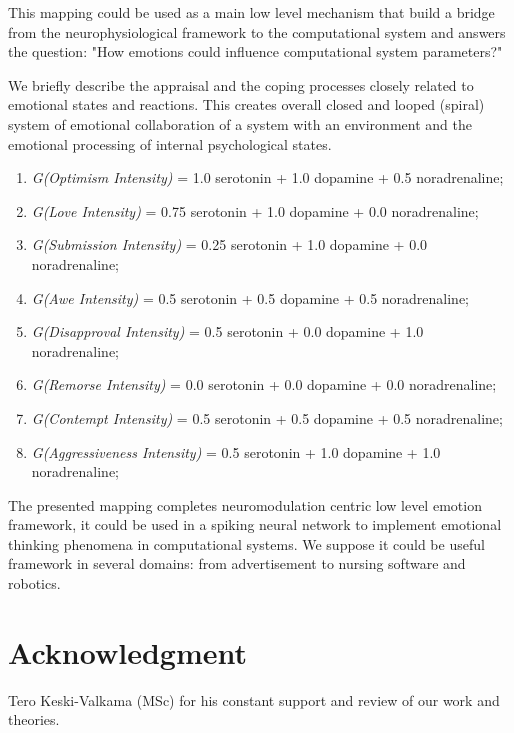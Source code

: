 This mapping could be used as a main low level mechanism that build a bridge from the neurophysiological framework to the computational system and answers the question: "How emotions could influence computational system parameters?"

We briefly describe the appraisal and the coping processes closely related to emotional states and reactions. This creates overall closed and looped (spiral) system of emotional collaboration of a system with an environment and the emotional processing of internal psychological states.

\begin{enumerate}
 \item  \emph{G(Optimism Intensity)} = 1.0 serotonin  + 1.0 dopamine + 0.5 noradrenaline;
 \item  \emph{G(Love Intensity)} = 0.75 serotonin + 1.0 dopamine + 0.0 noradrenaline;
 \item  \emph{G(Submission Intensity)} = 0.25 serotonin + 1.0 dopamine + 0.0 noradrenaline;
 \item  \emph{G(Awe Intensity)} = 0.5 serotonin + 0.5 dopamine + 0.5 noradrenaline;
 \item  \emph{G(Disapproval Intensity)} = 0.5 serotonin + 0.0 dopamine + 1.0 noradrenaline;
 \item  \emph{G(Remorse Intensity)} = 0.0 serotonin + 0.0 dopamine + 0.0 noradrenaline;
 \item  \emph{G(Contempt Intensity)} = 0.5 serotonin + 0.5 dopamine + 0.5 noradrenaline;
 \item  \emph{G(Aggressiveness Intensity)} = 0.5 serotonin + 1.0 dopamine + 1.0 noradrenaline;
\end{enumerate}

The presented mapping completes neuromodulation centric low level emotion framework, it could be used in a spiking neural network to implement emotional thinking phenomena in computational systems. We suppose it could be useful framework in several domains: from advertisement to nursing software and robotics.

\section{Acknowledgment}

Tero Keski-Valkama (MSc) for his constant support and review of our work and theories.
